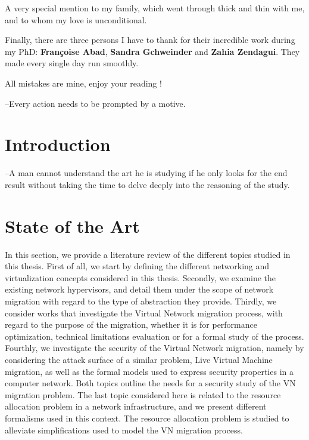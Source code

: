 \documentclass[a4paper, 11pt]{report}
\newcommand{\boxedtext}[1]{\fbox{\scriptsize\bfseries\textsf{#1}}}
\newcommand{\myremark}[2]{
   \textcolor{blue}{\boxedtext{#1}
      {\small$\blacktriangleright$\emph{\textsl{#2}}$\blacktriangleleft$}
}}
\newcommand\GB[1]{\myremark{GBAA}{#1}}
\theoremstyle{definition}
\begin{document}
A very special mention to my family, which went through thick and thin with me, and to whom my love is unconditional. 

Finally, there are three persons I have to thank for their incredible work during my PhD: \textbf{Fran\c{c}oise Abad}, \textbf{Sandra Gchweinder} and \textbf{Zahia Zendagui}. They made every single day run smoothly.

All mistakes are mine, enjoy your reading !

\newpage

\tableofcontents
\listoffigures
 \listoftables
\thispagestyle{empty}


\newpage
{}
\begin{savequote}
--Every action needs to be prompted by a motive.
\end{savequote}
\chapter{Introduction}

 

\newpage
\begin{savequote}[0.5\textwidth]
--A man cannot understand the art he is studying if he only looks for the end result without taking the time to delve deeply into the reasoning of the study.
\end{savequote}
\chapter{State of the Art}
\label{sec:sota}
In this section, we provide a literature review of the different topics studied in this thesis.
First of all, we start by defining the different networking and virtualization concepts considered in this thesis.
Secondly, we examine the existing network hypervisors, and detail them under the scope of network migration with regard to the type of abstraction they provide.
Thirdly, we consider works that investigate the Virtual Network migration process, with regard to the purpose of the migration, whether it is for performance optimization, technical limitations evaluation or for a formal study of the process.
Fourthly, we investigate the security of the Virtual Network migration, namely by considering the attack surface of a similar problem, Live Virtual Machine migration, as well as the formal models used to express security properties in a computer network.
Both topics outline the needs for a security study of the VN migration problem.
The last topic considered here is related to the resource allocation problem in a network infrastructure, and we present different formalisms used in this context.
The resource allocation problem is studied to alleviate simplifications used to model the VN migration process.
\end{document}
